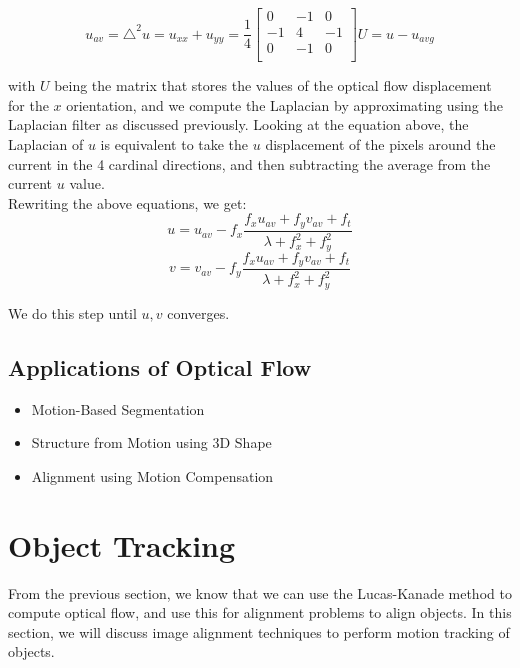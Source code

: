 \documentclass[12pt]{article}
\begin{document}
\begin{equation*}
u_{av} = \triangle^2 u = u_{xx} + u_{yy} = \frac{1}{4}
\begin{bmatrix}
0 & -1 & 0\\
-1 & 4 & -1\\
0 & -1 & 0\\
\end{bmatrix} U = u - u_{avg}
\end{equation*}

with $U$ being the matrix that stores the values of the optical flow displacement for the $x$ orientation, and we compute the Laplacian by approximating using the Laplacian filter as discussed previously. Looking at the equation above, the Laplacian of $u$ is equivalent to take the $u$ displacement of the pixels around the current in the 4 cardinal directions, and then subtracting the average from the current $u$ value.\\

Rewriting the above equations, we get:
\begin{equation*}
u = u_{av} - f_x\frac{f_x u_{av}+ f_y v_{av} + f_t}{\lambda + f_x^2+ f_y^2}
\end{equation*}
\begin{equation*}
v = v_{av} - f_y\frac{f_x u_{av}+ f_y v_{av} + f_t}{\lambda + f_x^2+ f_y^2}
\end{equation*}

We do this step until $u, v$ converges.

\subsection{Applications of Optical Flow}
\begin{itemize}
\item Motion-Based Segmentation
\item Structure from Motion using 3D Shape
\item Alignment using Motion Compensation
\end{itemize}

\section{Object Tracking}

From the previous section, we know that we can use the Lucas-Kanade method to compute optical flow, and use this for alignment problems to align objects. In this section, we will discuss image alignment techniques to perform motion tracking of objects.\\
\end{document}
